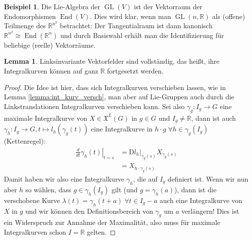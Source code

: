 \documentclass[a4paper]{scrreprt}
\numberwithin{equation}{chapter}
\newcommand{\DD}{\mathrm{D}}
\DeclareMathOperator{\GL}{GL}
\DeclareMathOperator{\End}{End}
\newcommand{\R}{\mathbb{R}}
\newcommand{\vf}{\mathfrak{X}}
\theoremstyle{definition}
\newtheorem{lemma}[defn]{Lemma}
\newtheorem{bsp}[defn]{Beispiel}
\begin{document}
		\begin{bsp}\hfill
			Die Lie-Algebra der $\GL(V)$ ist der Vektorraum der Endomorphismen $\End(V)$. Dies wird klar, wenn man $\GL(n,\R)$ als (offene) Teilmenge des $\R^{n^2}$ betrachtet: Der Tangentialraum ist dann kanonisch $\R^{n^2}\cong\End(\R^n)$ und durch Basiswahl erhält man die Identifizierung für beliebige (reelle) Vektorräume.
		\end{bsp}
		\begin{lemma}
			Linksinvariante Vektorfelder sind vollständig, das heißt, ihre Integralkurven können auf ganz $\R$ fortgesetzt werden.
			\begin{proof}
			Die Idee ist hier, dass sich Integralkurven verschieben lassen, wie in Lemma \ref{lemma:int_kurv_versch}, man aber auf Lie-Gruppen auch durch die Linkstranslationen Integralkurven verschieben kann. Sei also $\gamma_g\colon I_g\rightarrow G$ eine maximale Integralkurve von $X\in\vf^L(G)$ in $g\in G$ und $I_g\neq \R$, dann ist auch $\gamma_h\colon I_g\rightarrow G, t\mapsto l_h(\gamma_g(t))$ eine Integralkurve in $h\cdot g\;\forall h\in\gamma_g(I_g)$ (Kettenregel):
			\begin{align*}
				\left.\frac{d}{dt}\gamma_h(t)\right\vert_{t=s}&=\DD l_h\vert_{\gamma_g(s)} X_{\gamma_g(s)}\\
				&=X_{h\cdot \gamma_g(s)}
			\end{align*}
			Damit haben wir also eine Integralkurve $\gamma_h$, die auf $I_g$ definiert ist. Wenn wir nun aber $h$ so wählen, dass $g\in\gamma_h(I_g)$ gilt (und $g=\gamma_h(a)$), dann ist die verschobene Kurve $\lambda(t)=\gamma_h(t+a)\;\forall t\in I_g-a$ auch eine Integralkurve von $X$ in $g$ und wir können den Definitionsbereich von $\gamma_g$ um $a$ verlängern! Dies ist ein Widerspruch zur Annahme der Maximalität, also muss für maximale Integralkurven schon $I=\R$ gelten.
			\end{proof}
		\end{lemma}
\end{document}
